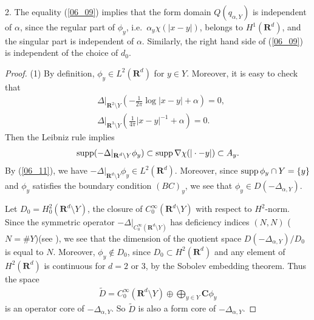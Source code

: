 \documentclass[12pt,a4paper]{article}
\def\supp{\mathop{\rm supp}\nolimits}
\begin{document}
2.
The equality (\ref{06_09}) implies that
the form domain $Q(q_{\alpha, Y})$ is independent of $\alpha$,
since the regular part of $\phi_y$, i.e.\ $\alpha_y \chi(|x-y|)$,
belongs to $H^1(\mathbf{R}^d)$,
and the singular part is independent of $\alpha$.
Similarly, the right hand side of (\ref{06_09}) 
is independent of the choice of $d_0$.
\begin{proof}
(1) By definition, $\phi_y\in L^2(\mathbf{R}^d)$ for $y\in Y$.
Moreover, it is easy to check that
\begin{align*}
& 
\Delta|_{\mathbf{R}^2\setminus Y}
\left(-\frac{1}{2\pi}\log|x-y|+\alpha\right)=0,\\
&\Delta|_{\mathbf{R}^3\setminus Y}
\left(\frac{1}{4\pi}|x-y|^{-1}+\alpha\right)=0.
\end{align*}
Then the Leibniz rule implies
\begin{align}
\supp (-\Delta|_{\mathbf{R}^d\setminus Y}\phi_y)
\subset \supp \nabla \chi(|\cdot-y|)
\subset A_y.
\label{06_11}
\end{align}
By (\ref{06_11}), we have $-\Delta|_{\mathbf{R}^d\setminus Y}\phi_y\in L^2(\mathbf{R}^d)$.
Moreover, since $\supp \phi_y \cap Y =\{y\}$ and
$\phi_y$ satisfies the boundary condition $(BC)_y$,
we see that $\phi_y\in D(-\Delta_{\alpha,Y})$.

Let $D_0=H^2_0(\mathbf{R}^d\setminus Y)$,
the closure of $C_0^\infty(\mathbf{R}^d\setminus Y)$
with respect to $H^2$-norm.
Since the symmetric operator $-\Delta|_{C_0^\infty(\mathbf{R}^d\setminus Y)}$
has deficiency indices $(N,N)$ ($N=\# Y$)(see \cite{Al-Ge-Ho-Ho}),
we see that
the dimension of the quotient space
$D(-\Delta_{\alpha,Y})/ D_0$
is equal to $N$.
Moreover, $\phi_y\not\in D_0$, since $D_0\subset H^2(\mathbf{R}^d)$
and any element of $H^2(\mathbf{R}^d)$ is continuous for $d=2$ or $3$,
by the Sobolev embedding theorem.
Thus the space
\begin{align*}
 \widetilde{D}
=C_0^\infty(\mathbf{R}^d\setminus{Y})\oplus 
\bigoplus_{y\in Y} \mathbf{C}\phi_y
\end{align*}
is an operator core of $-\Delta_{\alpha, Y}$.
So $\widetilde{D}$ is also a form core of $-\Delta_{\alpha, Y}$.



\end{proof}
\end{document}
